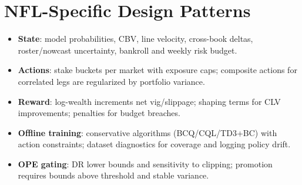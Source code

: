 \section{NFL-Specific Design Patterns}
\begin{itemize}
  \item \textbf{State}: model probabilities, CBV, line velocity, cross-book deltas, roster/nowcast uncertainty, bankroll and weekly risk budget.
  \item \textbf{Actions}: stake buckets per market with exposure caps; composite actions for correlated legs are regularized by portfolio variance.
  \item \textbf{Reward}: log-wealth increments net vig/slippage; shaping terms for CLV improvements; penalties for budget breaches.
  \item \textbf{Offline training}: conservative algorithms (BCQ/CQL/TD3+BC) with action constraints; dataset diagnostics for coverage and logging policy drift.
  \item \textbf{OPE gating}: DR lower bounds and sensitivity to clipping; promotion requires bounds above threshold and stable variance.
\end{itemize}

